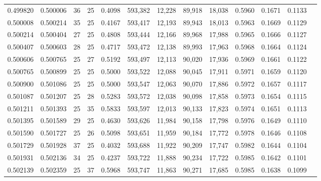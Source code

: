 \begin{tabular}{rrrrrrrrrrrrr}
0.499820 & 0.500006 &    36 &  25 &                                     0.4098 & 593,382 &  12,228 &  89,918 &  18,038 & 0.5960 & 0.1671 & 0.1133 \\
0.500008 & 0.500214 &    35 &  25 &                                     0.4167 & 593,417 &  12,193 &  89,943 &  18,013 & 0.5963 & 0.1669 & 0.1129 \\
0.500214 & 0.500404 &    27 &  25 &                                     0.4808 & 593,444 &  12,166 &  89,968 &  17,988 & 0.5965 & 0.1666 & 0.1127 \\
0.500407 & 0.500603 &    28 &  25 &                                     0.4717 & 593,472 &  12,138 &  89,993 &  17,963 & 0.5968 & 0.1664 & 0.1124 \\
0.500606 & 0.500765 &    25 &  27 &                                     0.5192 & 593,497 &  12,113 &  90,020 &  17,936 & 0.5969 & 0.1661 & 0.1122 \\
0.500765 & 0.500899 &    25 &  25 &                                     0.5000 & 593,522 &  12,088 &  90,045 &  17,911 & 0.5971 & 0.1659 & 0.1120 \\
0.500900 & 0.501086 &    25 &  25 &                                     0.5000 & 593,547 &  12,063 &  90,070 &  17,886 & 0.5972 & 0.1657 & 0.1117 \\
0.501087 & 0.501207 &    25 &  28 &                                     0.5283 & 593,572 &  12,038 &  90,098 &  17,858 & 0.5973 & 0.1654 & 0.1115 \\
0.501211 & 0.501393 &    25 &  35 &                                     0.5833 & 593,597 &  12,013 &  90,133 &  17,823 & 0.5974 & 0.1651 & 0.1113 \\
0.501395 & 0.501589 &    29 &  25 &                                     0.4630 & 593,626 &  11,984 &  90,158 &  17,798 & 0.5976 & 0.1649 & 0.1110 \\
0.501590 & 0.501727 &    25 &  26 &                                     0.5098 & 593,651 &  11,959 &  90,184 &  17,772 & 0.5978 & 0.1646 & 0.1108 \\
0.501729 & 0.501928 &    37 &  25 &                                     0.4032 & 593,688 &  11,922 &  90,209 &  17,747 & 0.5982 & 0.1644 & 0.1104 \\
0.501931 & 0.502136 &    34 &  25 &                                     0.4237 & 593,722 &  11,888 &  90,234 &  17,722 & 0.5985 & 0.1642 & 0.1101 \\
0.502139 & 0.502359 &    25 &  37 &                                     0.5968 & 593,747 &  11,863 &  90,271 &  17,685 & 0.5985 & 0.1638 & 0.1099 \\

\end{tabular}

